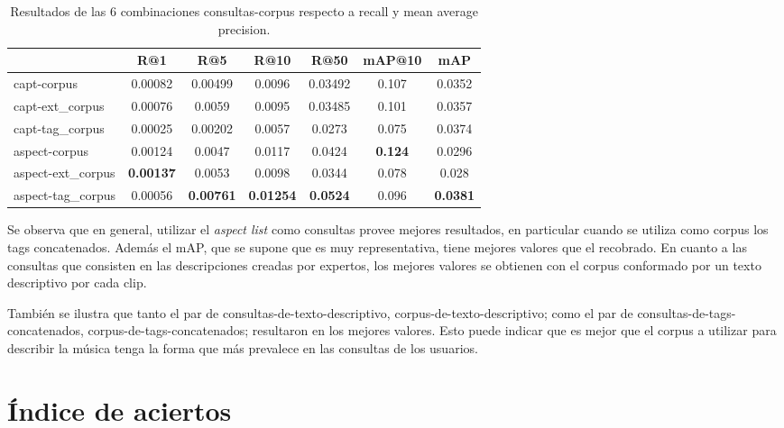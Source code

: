 \begin{table}[h]
    \footnotesize
    \centering
    \begin{tabular} { | l | c | c | c | c | c | c | }
    \hline
                      &   R@1           &   R@5   &   R@10         &   R@50          & mAP@10        &   mAP   \\ 
    \hline
    capt-corpus       & 0.00082         & 0.00499 & 0.0096         & 0.03492         & 0.107         & 0.0352 \\
    capt-ext\_corpus   & 0.00076         & 0.0059  & 0.0095         & 0.03485        & 0.101         & 0.0357  \\ 
    capt-tag\_corpus   & 0.00025         & 0.00202 & 0.0057         & 0.0273         & 0.075         & 0.0374  \\ 
    aspect-corpus     & 0.00124         & 0.0047  & 0.0117         & 0.0424          &\textbf{0.124} & 0.0296 \\ 
    aspect-ext\_corpus &\textbf{0.00137} & 0.0053  & 0.0098         & 0.0344         & 0.078         & 0.028 \\ 
    aspect-tag\_corpus & 0.00056 &\textbf{0.00761} &\textbf{0.01254} &\textbf{0.0524} & 0.096 &\textbf{0.0381} \\ 
    \hline
    \end{tabular}
    \caption{Resultados de las 6 combinaciones consultas-corpus	respecto a recall y mean average precision.}
    \label{tab:results}
\end{table}

Se observa que en general, utilizar el \textit{aspect list} como consultas provee mejores resultados, en particular cuando se utiliza como corpus los tags concatenados. Además el mAP, que se supone que es muy representativa, tiene mejores valores que el recobrado. En cuanto a las consultas que consisten en las descripciones creadas por expertos, los mejores valores se obtienen con el corpus conformado por un texto descriptivo por cada clip. 

También se ilustra que tanto el par de consultas-de-texto-descriptivo, corpus-de-texto-descriptivo; como el par de consultas-de-tags-concatenados, corpus-de-tags-concatenados; resultaron en los mejores valores. Esto puede indicar que es mejor que el corpus a utilizar para describir la música tenga la forma que más prevalece en las consultas de los usuarios. 

\section{Índice de aciertos}
\label{sec:experiment2}

